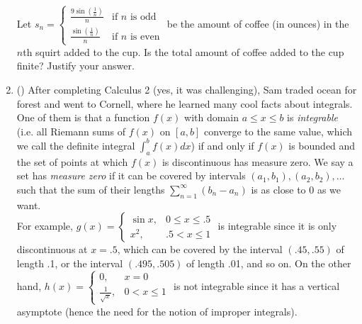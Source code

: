 \documentclass{article}
\begin{document}
\begin{enumerate}
Let $s_n = \begin{cases} \frac{9\sin(\frac{1}{n})}{n} & \text{if } n \text{ is odd} \\ \frac{\sin(\frac{1}{n})}{n} & \text{if } n \text{ is even} \end{cases}$ be the amount of coffee (in ounces) in the $n$th squirt added to the cup. Is the total amount of coffee added to the cup finite? Justify your answer.       

\vfill



\item (\textasteriskcentered{}) After completing Calculus 2 (yes, it was challenging), Sam traded ocean for forest and went to Cornell, where he learned many cool facts about integrals. One of them is that a function $f(x)$ with domain $a \leq x \leq b$ is \textit{integrable} (i.e. all Riemann sums of $f(x)$ on $[a,b]$ converge to the same value, which we call the definite integral $\int_a^b f(x)dx$) if and only if $f(x)$ is bounded and the set of points at which $f(x)$ is discontinuous has measure zero. We say a set has \textit{measure zero} if it can be covered by intervals $(a_1,b_1),(a_2,b_2),\dots$ such that the sum of their lengths $\sum_{n=1}^\infty (b_n-a_n)$ is as close to 0 as we want. \\ 

For example, $g(x) = \begin{cases} \sin x, & 0 \leq x \leq .5 \\ x^2, & .5 < x \leq 1 \end{cases}$ is integrable since it is only discontinuous at $x = .5$, which can be covered by the interval $(.45,.55)$ of length .1, or the interval $(.495,.505)$ of length .01, and so on. On the other hand, $h(x) = \begin{cases} 0, & x = 0 \\ \frac{1}{\sqrt{x}}, & 0 < x \leq 1 \end{cases}$ is not integrable since it has a vertical asymptote (hence the need for the notion of improper integrals). \\


\end{enumerate}
\end{document}
